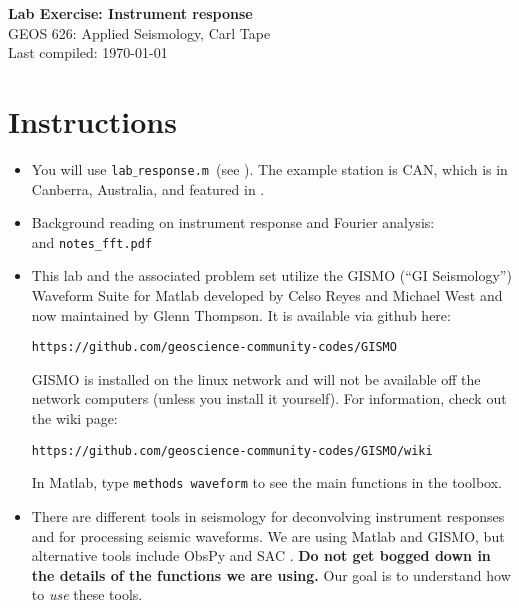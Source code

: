 \documentclass[11pt,titlepage,fleqn]{article}
\newcommand{\tfile}{{\tt lab$\_$response.m}}
\begin{document}

\begin{spacing}{1.2}
\centering
{\large \bf Lab Exercise: Instrument response} \\
GEOS 626: Applied Seismology, Carl Tape \\
Last compiled: \today
\end{spacing}


\section{Instructions}

\begin{itemize}

\item You will use \tfile\ (see ). The example station is CAN, which is in Canberra, Australia, and featured in \citet[][Figure~1]{Park2005}.


\item Background reading on instrument response and Fourier analysis: \\ \citet[][Ch.~6]{SteinWysession} and \verb+notes_fft.pdf+


\item This lab and the associated problem set utilize the GISMO (``GI Seismology'') Waveform Suite for Matlab developed by Celso Reyes and Michael West \citep{ReyesWest2011} and now maintained by Glenn Thompson. It is available via github here:

\verb+https://github.com/geoscience-community-codes/GISMO+

GISMO is installed on the linux network and will not be available off the network computers (unless you install it yourself). For information, check out the wiki page:

\verb+https://github.com/geoscience-community-codes/GISMO/wiki+

In Matlab, type \verb+methods waveform+ to see the main functions in the toolbox.


\item There are different tools in seismology for deconvolving instrument responses and for processing seismic waveforms. We are using Matlab and GISMO, but alternative tools include ObsPy \citep{obspy2010} and SAC \citep{SAC}. {\bf Do not get bogged down in the details of the functions we are using.} Our goal is to understand how to {\em use} these tools.


\end{itemize}
\end{document}
